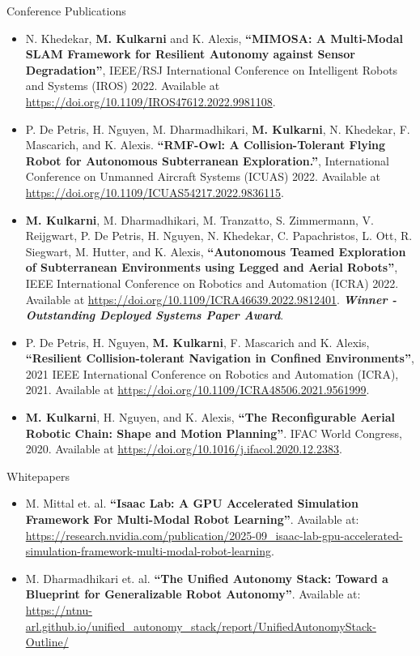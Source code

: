 \documentclass{resume} %
\begin{document}
\begin{rSection}{Conference Publications}
\begin{itemize}
    \item N. Khedekar, \textbf{M. Kulkarni} and K. Alexis, \textbf{``MIMOSA: A Multi-Modal SLAM Framework for Resilient Autonomy against Sensor Degradation''}, IEEE/RSJ International Conference on Intelligent Robots and Systems (IROS) 2022. Available at \url{https://doi.org/10.1109/IROS47612.2022.9981108}.
    \item P. De Petris, H. Nguyen, M. Dharmadhikari, \textbf{M. Kulkarni}, N. Khedekar, F. Mascarich, and K. Alexis. \textbf{``RMF-Owl: A Collision-Tolerant Flying Robot for Autonomous Subterranean Exploration.''}, International Conference on Unmanned Aircraft Systems (ICUAS) 2022. Available at \url{https://doi.org/10.1109/ICUAS54217.2022.9836115}.
    \item \textbf{M. Kulkarni}, M. Dharmadhikari, M. Tranzatto, S. Zimmermann, V. Reijgwart, P. De Petris, H. Nguyen, N. Khedekar, C. Papachristos, L. Ott, R. Siegwart, M. Hutter, and K. Alexis, \textbf{``Autonomous Teamed Exploration of Subterranean Environments using Legged and Aerial Robots''}, IEEE International Conference on Robotics and Automation (ICRA) 2022. Available at \url{https://doi.org/10.1109/ICRA46639.2022.9812401}. \textit{\textbf{Winner - Outstanding Deployed Systems Paper Award}}.
    \item P. De Petris, H. Nguyen, \textbf{M. Kulkarni}, F. Mascarich and K. Alexis, \textbf{``Resilient Collision-tolerant Navigation in Confined Environments''}, 2021 IEEE International Conference on Robotics and Automation (ICRA), 2021. Available at \url{https://doi.org/10.1109/ICRA48506.2021.9561999}.
    \item \textbf{M. Kulkarni}, H. Nguyen, and K. Alexis, \textbf{``The Reconfigurable Aerial Robotic Chain: Shape and Motion Planning''}. IFAC World Congress, 2020. Available at \url{https://doi.org/10.1016/j.ifacol.2020.12.2383}.
\end{itemize}
\end{rSection}

\begin{rSection}{Whitepapers}
\begin{itemize}
    \item M. Mittal et. al. \textbf{``Isaac Lab: A GPU Accelerated Simulation Framework For Multi-Modal Robot Learning''}. Available at: \url{https://research.nvidia.com/publication/2025-09_isaac-lab-gpu-accelerated-simulation-framework-multi-modal-robot-learning}.
    \item M. Dharmadhikari et. al. \textbf{``The Unified Autonomy Stack: Toward a Blueprint for Generalizable Robot Autonomy''}. Available at: \url{https://ntnu-arl.github.io/unified_autonomy_stack/report/UnifiedAutonomyStack-Outline/}
\end{itemize}
\end{rSection}
\end{document}
